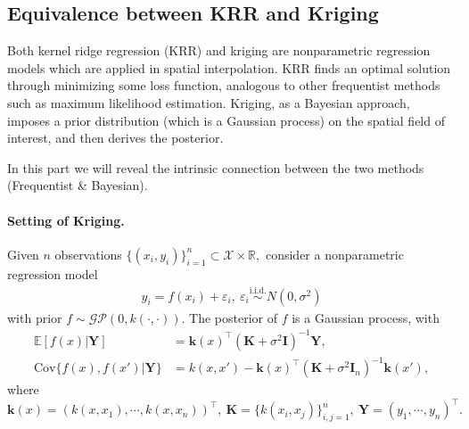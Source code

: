 \documentclass{article}
\begin{document}
\subsection{Equivalence between KRR and Kriging}
Both kernel ridge regression (KRR) and kriging are nonparametric regression models which are applied in spatial interpolation. KRR finds an optimal solution through minimizing some loss function, analogous to other frequentist methods such as maximum likelihood estimation. Kriging, as a Bayesian approach, imposes a prior distribution (which is a Gaussian process) on the spatial field of interest, and then derives the posterior.

In this part we will reveal the intrinsic connection between the two methods (Frequentist \& Bayesian).

\paragraph{Setting of Kriging.} Given $n$ observations $\lbrace(x_i,y_i)\rbrace_{i=1}^n\subset\mathcal{X}\times\mathbb{R},$ consider a nonparametric regression model 
\begin{align*}
	y_i = f(x_i) + \varepsilon_i,\ \varepsilon_i\overset{\mathrm{i.i.d.}}{\sim}N(0,\sigma^2)\tag{6.14}
\end{align*}
with prior $f\sim\mathcal{GP}\left(0,k(\cdot,\cdot)\right).$ The posterior of $f$ is a Gaussian process, with
\begin{align*}
	\mathbb{E}[f(x)|\mathbf{Y}] &= \mathbf{k}(x)^\top(\mathbf{K} + \sigma^2\mathbf{I})^{-1}\mathbf{Y},\\
	\mathrm{Cov}\lbrace f(x),f(x')|\mathbf{Y}\rbrace &= k(x,x') - \mathbf{k}(x)^\top(\mathbf{K} + \sigma^2\mathbf{I}_n)^{-1}\mathbf{k}(x'),\tag{6.15}
\end{align*}
where $\mathbf{k}(x)=\left(k(x,x_1),\cdots,k(x,x_n)\right)^\top,\ \mathbf{K}=\lbrace k(x_i,x_j)\rbrace_{i,j=1}^n,\ \mathbf{Y}=(y_1,\cdots,y_n)^\top.$
\end{document}
